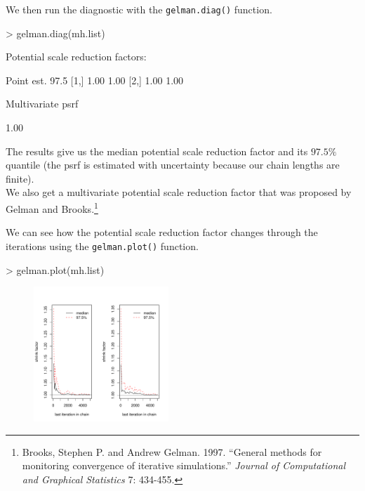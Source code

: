 \documentclass[handout]{beamer}
\begin{document}
\begin{frame}[fragile]
We then run the diagnostic with the {\tt gelman.diag()} function.
\pause
\medskip
\tiny
\begin{Schunk}
\begin{Sinput}
> gelman.diag(mh.list)
\end{Sinput}
\begin{Soutput}
Potential scale reduction factors:

     Point est. 97.5%
[1,]       1.00           1.00
[2,]       1.00           1.00

Multivariate psrf

1.00
\end{Soutput}
\end{Schunk}
\normalsize
\bigskip
\pause
The results give us the median potential scale reduction factor and
its $97.5\%$ quantile (the psrf is estimated with uncertainty because
our chain lengths are finite).  \\
\bigskip
\pause
We also get a multivariate potential scale reduction factor that was
proposed by Gelman and Brooks.\footnote{\tiny Brooks, Stephen P. and
Andrew Gelman. 1997. ``General methods for monitoring convergence of iterative simulations.'' \textit{Journal of Computational and Graphical Statistics} 7: 434-455. }
\end{frame}

\begin{frame}[fragile]
\normalsize
We can see how the potential scale reduction factor changes through
the iterations using the {\tt gelman.plot()} function.
\pause
\medskip
\tiny
\begin{Schunk}
\begin{Sinput}
> gelman.plot(mh.list)
\end{Sinput}
\end{Schunk}
\begin{figure}[!htp]
\begin{center}
\includegraphics[width=2in, height=2in]{convergence-gelman.pdf}
\end{center}
\end{figure}
\normalsize
\end{frame}
\end{document}
